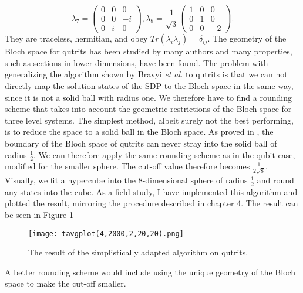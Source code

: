 \[
\lambda_7=\begin{pmatrix} 0 & 0 & 0 \\ 0 & 0 & -i \\ 0 & i & 0 \end{pmatrix},
\lambda_8=\frac{1}{\sqrt{3}} \begin{pmatrix} 1 & 0 & 0 \\ 0 & 1 & 0 \\ 0 & 0 & -2 \end{pmatrix}
.\]
They are traceless, hermitian, and obey $Tr\left(\lambda_i\lambda_j\right)=\delta_{ij}$.
The geometry of the Bloch space for qutrits has been studied by many authors \cite{mendas06,goyal16,kimura03} and many properties, such as sections in lower dimensions, have been found.
The problem with generalizing the algorithm shown by Bravyi \emph{et al.} to qutrits is that we can not directly map the solution states of the SDP to the Bloch space in the same way, since it is not a solid ball with radius one.
We therefore have to find a rounding scheme that takes into account the geometric restrictions of the Bloch space for three level systems.
The simplest method, albeit surely not the best performing, is to reduce the space to a solid ball in the Bloch space.
As proved in \cite{goyal16}, the boundary of the Bloch space of qutrits can never stray into the solid ball of radius $\frac{1}{2}$. 
We can therefore apply the same rounding scheme as in the qubit case, modified for the smaller sphere.
The cut-off value therefore becomes $\frac{1}{2\sqrt{8}}$.
Visually, we fit a hypercube into the $8$-dimensional sphere of radius $\frac{1}{2}$ and round any states into the cube.
As a field study, I have implemented this algorithm and plotted the result, mirroring the procedure described in chapter 4.
The result can be seen in Figure \ref{fig:4}
\begin{figure}[H]
	\centering
	\texttt{[image: tavgplot(4,2000,2,20,20).png]}
	\caption{The result of the simplistically adapted algorithm on qutrits.}
	\label{fig:4}
\end{figure}
\noindent A better rounding scheme would include using the unique geometry of the Bloch space to make the cut-off smaller.

